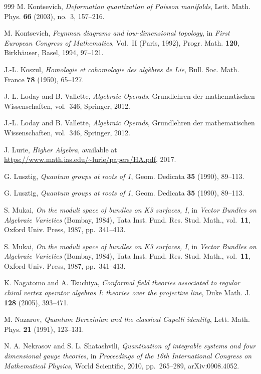 \begin{thebibliography}{999}
M. Kontsevich, \emph{Deformation quantization of Poisson manifolds}, Lett. Math. Phys. \textbf{66} (2003), no.~3, 157--216.

M. Kontsevich, \emph{Feynman diagrams and low-dimensional topology}, in \emph{First European Congress of Mathematics}, Vol.~II (Paris, 1992), Progr. Math. \textbf{120}, Birkh\"auser, Basel, 1994, 97--121.

J.-L. Koszul, \emph{Homologie et cohomologie des alg\`ebres de Lie}, Bull. Soc. Math. France \textbf{78} (1950), 65--127.

J.-L. Loday and B. Vallette, \emph{Algebraic Operads}, Grundlehren der mathematischen Wissenschaften, vol.~346, Springer, 2012.

J.-L. Loday and B. Vallette, \emph{Algebraic Operads}, Grundlehren der mathematischen Wissenschaften, vol.~346, Springer, 2012.

J. Lurie, \emph{Higher Algebra}, available at \url{https://www.math.ias.edu/~lurie/papers/HA.pdf}, 2017.

G. Lusztig, \emph{Quantum groups at roots of 1}, Geom. Dedicata \textbf{35} (1990), 89--113.

G. Lusztig, \emph{Quantum groups at roots of 1}, Geom. Dedicata \textbf{35} (1990), 89--113.

S. Mukai, \emph{On the moduli space of bundles on K3 surfaces, I}, in \emph{Vector Bundles on Algebraic Varieties} (Bombay, 1984), Tata Inst. Fund. Res. Stud. Math., vol.~\textbf{11}, Oxford Univ. Press, 1987, pp.~341--413.

S. Mukai, \emph{On the moduli space of bundles on K3 surfaces, I}, in \emph{Vector Bundles on Algebraic Varieties} (Bombay, 1984), Tata Inst. Fund. Res. Stud. Math., vol.~\textbf{11}, Oxford Univ. Press, 1987, pp.~341--413.

K. Nagatomo and A. Tsuchiya, \emph{Conformal field theories associated to regular chiral vertex operator algebras I: theories over the projective line}, Duke Math. J. \textbf{128} (2005), 393--471.

M. Nazarov, \emph{Quantum Berezinian and the classical Capelli identity}, Lett. Math. Phys. \textbf{21} (1991), 123--131.

N. A. Nekrasov and S. L. Shatashvili, \emph{Quantization of integrable systems and four dimensional gauge theories}, in \emph{Proceedings of the 16th International Congress on Mathematical Physics}, World Scientific, 2010, pp.~265--289, arXiv:0908.4052.


\end{thebibliography}
